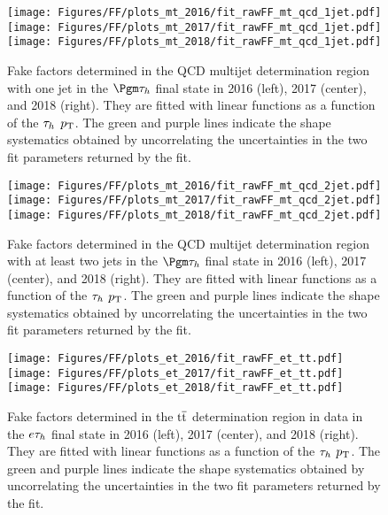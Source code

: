 \begin{figure}[ht!b]
\centering
\texttt{[image: Figures/FF/plots\_mt\_2016/fit\_rawFF\_mt\_qcd\_1jet.pdf]}
\texttt{[image: Figures/FF/plots\_mt\_2017/fit\_rawFF\_mt\_qcd\_1jet.pdf]}
\texttt{[image: Figures/FF/plots\_mt\_2018/fit\_rawFF\_mt\_qcd\_1jet.pdf]}\\
\caption{\label{fig:fit_raw_mt_1jet_qcd} Fake factors determined in the QCD multijet determination region with one jet in the $\Pgm\tauh$ final state in 2016 (left), 2017 (center), and 2018 (right). They are fitted with linear functions as a function of the $\tau_h$ $p_{\mathrm{T}}$. The green and purple lines indicate the shape systematics obtained by uncorrelating the uncertainties in the two fit parameters returned by the fit.  }
\end{figure}

\begin{figure}[ht!b]
\centering
\texttt{[image: Figures/FF/plots\_mt\_2016/fit\_rawFF\_mt\_qcd\_2jet.pdf]}
\texttt{[image: Figures/FF/plots\_mt\_2017/fit\_rawFF\_mt\_qcd\_2jet.pdf]}
\texttt{[image: Figures/FF/plots\_mt\_2018/fit\_rawFF\_mt\_qcd\_2jet.pdf]}\\
\caption{\label{fig:fit_raw_mt_2jet_qcd} Fake factors determined in the QCD multijet determination region with at least two jets in the $\Pgm\tauh$ final state in 2016 (left), 2017 (center), and 2018 (right). They are fitted with linear functions as a function of the $\tau_h$ $p_{\mathrm{T}}$. The green and purple lines indicate the shape systematics obtained by uncorrelating the uncertainties in the two fit parameters returned by the fit.  }
\end{figure}

\begin{figure}[ht!b]
\centering
\texttt{[image: Figures/FF/plots\_et\_2016/fit\_rawFF\_et\_tt.pdf]}
\texttt{[image: Figures/FF/plots\_et\_2017/fit\_rawFF\_et\_tt.pdf]}
\texttt{[image: Figures/FF/plots\_et\_2018/fit\_rawFF\_et\_tt.pdf]}\\
\caption{\label{fig:fit_raw_et_tt} Fake factors determined in the $\mathrm{t}\overline{\mathrm{t}}$ determination region in data in the $e\tau_h$ final state in 2016 (left), 2017 (center), and 2018 (right). They are fitted with linear functions as a function of the $\tau_h$ $p_{\mathrm{T}}$. The green and purple lines indicate the shape systematics obtained by uncorrelating the uncertainties in the two fit parameters returned by the fit.  }
\end{figure}


